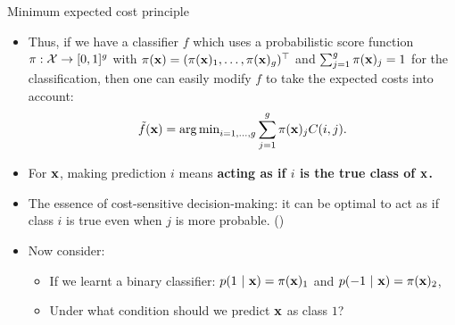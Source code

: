 \documentclass[11pt,compress,t,notes=noshow, xcolor=table]{beamer}
\begin{document}
\begin{vbframe}{Minimum expected cost principle}
    \footnotesize
    \begin{itemize}
        \item Thus, if we have a classifier $f$ which uses a probabilistic score function $\pi:\mathcal{X} \to [0,1]^g$ with $\pi(\mathbf{x}) = (\pi(\mathbf{x})_1,\ldots,\pi(\mathbf{x})_g)^\top$ and $\sum_{j=1}^g \pi(\mathbf{x})_j = 1$ for the classification, then one can easily modify $f$ to take the expected costs into account:
		$$  \tilde f (\mathbf{x}) = \operatorname{arg\,min}_{i=1,\ldots,g} \sum_{j=1}^g 	\pi(\mathbf{x})_j C(i,j). $$
        \vspace{10pt}

        \item For $\mathbf{x}$, making prediction $i$ means \textbf{acting as if $i$ is the true class of $\mathbf{x}$.}
        \vspace{10pt}
        
        \item The essence of cost-sensitive decision-making: it can be optimal to act as if class $i$ is true even when $j$ is more probable. (\href{https://dl.acm.org/doi/10.5555/1642194.1642224}{})
        \vspace{10pt}

        \item Now consider: 
        \begin{itemize}
            \footnotesize
            \item If we learnt a binary classifier: $p(1 ~|~ \mathbf{x}) = \pi(\mathbf{x})_1$ and $p(-1 ~|~ \mathbf{x}) = \pi(\mathbf{x})_2$,
            \item Under what condition should we predict $\mathbf{x}$ as class $1$?
        \end{itemize}
    \end{itemize}
\end{vbframe}
\end{document}
